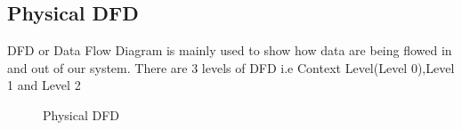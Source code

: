 \subsection{Physical DFD}
DFD or Data Flow Diagram is mainly used to show how data are being flowed in and out of our system. There are 3 levels of DFD i.e Context Level(Level 0),Level 1 and Level 2
\begin{figure}[H]
    \centering
    \caption{Physical DFD}
\end{figure}
\newpage
